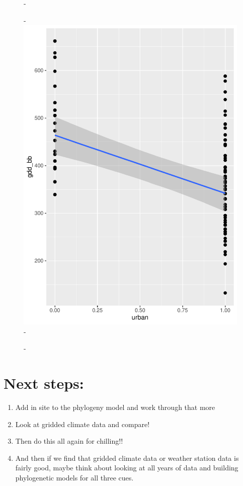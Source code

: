 \documentclass{article}\usepackage[]{graphicx}\usepackage[]{color}
\begin{document}
  {\begin{figure} [H]
  -\begin{center}
  -\includegraphics[width=12cm]{..//analyses/figures/urbaneffect.pdf}
  -\end{center}
  -\end{figure}}
  
  
\section*{Next steps:}

\begin{enumerate}
\item Add in site to the phylogeny model and work through that more
\item Look at gridded climate data and compare!
\item Then do this all again for chilling!!
\item And then if we find that gridded climate data or weather station data is fairly good, maybe think about looking at all years of data and building phylogenetic models for all three cues. 
\end{enumerate}
\end{document}
